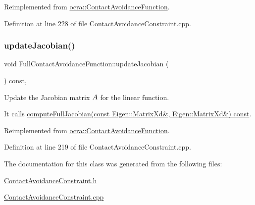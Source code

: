 Reimplemented from \hyperlink{classocra_1_1ContactAvoidanceFunction_aed2f145f17ff9fd8dd646018376ea7e9}{ocra\+::\+Contact\+Avoidance\+Function}.



Definition at line 228 of file Contact\+Avoidance\+Constraint.\+cpp.

\hypertarget{classocra_1_1FullContactAvoidanceFunction_a91b21004faed7ffa6a51e975abc93797}{}\label{classocra_1_1FullContactAvoidanceFunction_a91b21004faed7ffa6a51e975abc93797} 
\subsubsection{\texorpdfstring{update\+Jacobian()}{updateJacobian()}}
{\footnotesize\ttfamily void Full\+Contact\+Avoidance\+Function\+::update\+Jacobian (\begin{DoxyParamCaption}{ }\end{DoxyParamCaption}) const\hspace{0.3cm}{\ttfamily [protected]}, {\ttfamily [virtual]}}

Update the Jacobian matrix $ A $ for the linear function.

It calls \hyperlink{classocra_1_1ContactAvoidanceFunction_a59994d2c3f364575ecff7fb23b7e10ab}{compute\+Full\+Jacobian(const Eigen\+::\+Matrix\+Xd\&, Eigen\+::\+Matrix\+Xd\&) const}. 

Reimplemented from \hyperlink{classocra_1_1ContactAvoidanceFunction_aca72dc43ecd3d95bb917139ac6ae19c1}{ocra\+::\+Contact\+Avoidance\+Function}.



Definition at line 219 of file Contact\+Avoidance\+Constraint.\+cpp.



The documentation for this class was generated from the following files\+:\begin{DoxyCompactItemize}
\item 
\hyperlink{ContactAvoidanceConstraint_8h}{Contact\+Avoidance\+Constraint.\+h}\item 
\hyperlink{ContactAvoidanceConstraint_8cpp}{Contact\+Avoidance\+Constraint.\+cpp}\end{DoxyCompactItemize}
